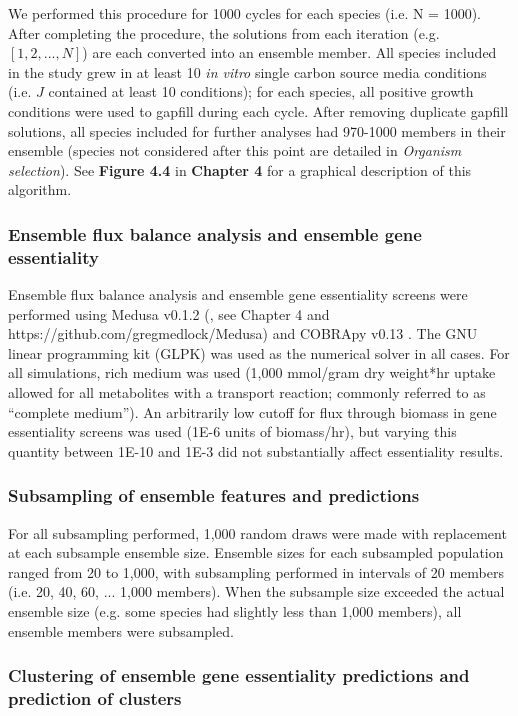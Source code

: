 \documentclass[11pt,twocolumn,notitlepage,openany,twoside]{book}
\begin{document}
\begin{refsection}
We performed this procedure for 1000 cycles for each species (i.e. N = 1000). After completing the procedure, the solutions from each iteration (e.g. $[1,2,...,N]$) are each converted into an ensemble member. All species included in the study grew in at least 10 \textit{in vitro} single carbon source media conditions (i.e. $J$ contained at least 10 conditions); for each species, all positive growth conditions were used to gapfill during each cycle. After removing duplicate gapfill solutions, all species included for further analyses had 970-1000 members in their ensemble (species not considered after this point are detailed in \textit{Organism selection}). See \textbf{Figure 4.4} in \textbf{Chapter 4} for a graphical description of this algorithm.

\subsubsection{Ensemble flux balance analysis and ensemble gene essentiality}

Ensemble flux balance analysis and ensemble gene essentiality screens were performed using Medusa v0.1.2 (\cite{Medlock547174}, see Chapter 4 and https://github.com/gregmedlock/Medusa) and COBRApy v0.13 \cite{Ebrahim2013-eb}. The GNU linear programming kit (GLPK) was used as the numerical solver in all cases. For all simulations, rich medium was used (1,000 mmol/gram dry weight*hr uptake allowed for all metabolites with a transport reaction; commonly referred to as “complete medium”). An arbitrarily low cutoff for flux through biomass in gene essentiality screens was used (1E-6 units of biomass/hr), but varying this quantity between 1E-10 and 1E-3 did not substantially affect essentiality results.

\subsubsection{Subsampling of ensemble features and predictions}

For all subsampling performed, 1,000 random draws were made with replacement at each subsample ensemble size. Ensemble sizes for each subsampled population ranged from 20 to 1,000, with subsampling performed in intervals of 20 members (i.e. 20, 40, 60, ... 1,000 members). When the subsample size exceeded the actual ensemble size (e.g. some species had slightly less than 1,000 members), all ensemble members were subsampled.

\subsubsection{Clustering of ensemble gene essentiality predictions and prediction of clusters}


\end{refsection}
\end{document}
